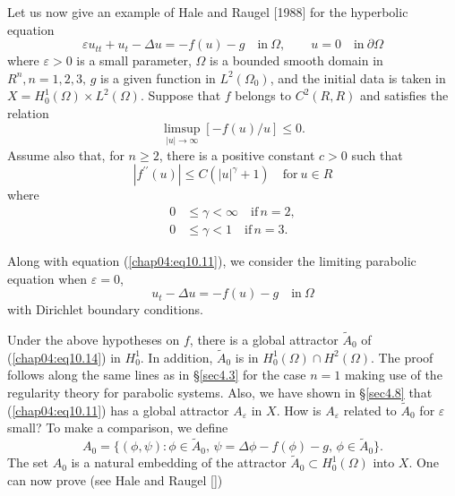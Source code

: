 \documentclass{surv-l}
\theoremstyle{plain}
\theoremstyle{definition}
\numberwithin{equation}{section}
\numberwithin{figure}{chapter}
\begin{document}
Let us now give an example of Hale and Raugel [1988] for the hyperbolic equation
\begin{equation}\label{chap04:eq10.11}
\varepsilon u_{tt}+u_{t}-\Delta u=-f(u)-g\quad \mathrm{in}\ \Omega,\quad\quad u=0\quad \mathrm{in}\ \partial\Omega
\end{equation}
where $\varepsilon>0$ is a small parameter, $\Omega$ is a bounded smooth domain in $R^{n}, n=1,2,3,\,g$ is a given function in $L^{2}(\Omega_{0})$, and the initial data is taken in $X= H_{0}^{1}(\Omega)\times L^{2}(\Omega)$. Suppose that $f$ belongs to $C^{2}(R, R)$ and satisfies the relation
\begin{equation}\label{chap04:eq10.12}
\mathop{\limsup}_{|u|\rightarrow\infty}[-f(u)/u]\leq 0.
\end{equation}
Assume also that, for $n\geq 2$, there is a positive constant $c>0$ such that
\begin{equation}\label{chap04:eq10.13}
|f^{\prime\prime}(u)|\leq C(|u|^{\gamma}+1)\quad \mathrm{for}\ u\in R
\end{equation}
where
\begin{align*}
0&\leq\gamma<\infty\quad \mathrm{if}\, n=2,\\
0&\leq\gamma<1\quad \mathrm{if}\, n=3.
\end{align*}

Along with equation (\ref{chap04:eq10.11}), we consider the limiting parabolic equation when $\varepsilon=0$,
\begin{equation}\label{chap04:eq10.14}
u_{t}-\Delta u=-f(u)-g\quad \mathrm{in}\ \Omega
\end{equation}
with Dirichlet boundary conditions.

Under the above hypotheses on $f$, there is a global attractor $\tilde{A}_{0}$ of (\ref{chap04:eq10.14}) in $H_{0}^{1}$. In addition, $\tilde{A}_{0}$ is in $H_{0}^{1}(\Omega)\cap H^{2}(\Omega)$. The proof follows along the same lines as in \S \ref{sec4.3} for the case $n=1$ making use of the regularity theory for parabolic systems. Also, we have shown in \S \ref{sec4.8} that (\ref{chap04:eq10.11}) has a global attractor $A_{\varepsilon}$ in $X$. How is $A_{\varepsilon}$ related to $\tilde{A}_{0}$ for $\varepsilon$ small? To make a comparison, we define
\begin{equation*}
A_{0}=\{(\phi, \psi):\phi \in\tilde{A}_{0},\, \psi=\Delta\phi-f(\phi)-g,\, \phi\in\tilde{A}_{0}\}.
\end{equation*}
The set $A_{0}$ is a natural embedding of the attractor $\tilde{A}_{0}\subset H_{0}^{1}(\Omega)$ into $X$. One can now prove (see Hale and Raugel [\citeyear{1988hra}])
\end{document}
